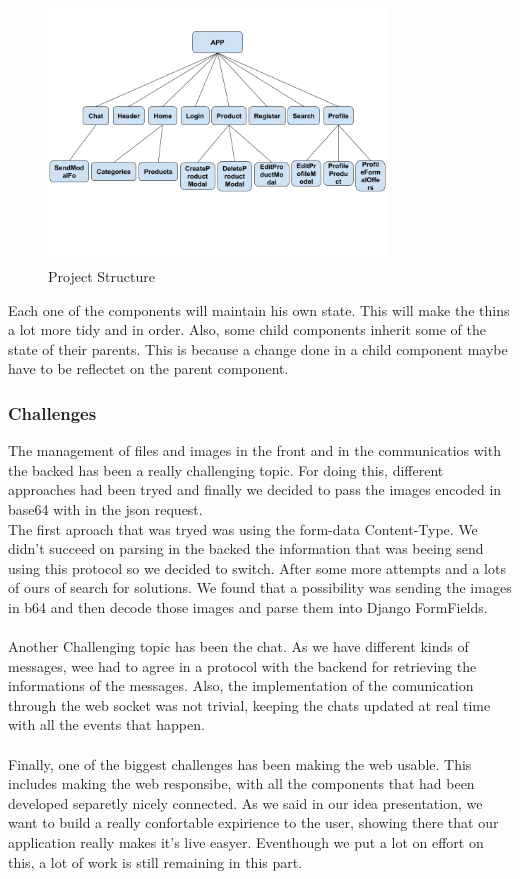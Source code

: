 \documentclass[./main.tex]{subfiles}
\begin{document}
\begin{figure}[H]
	\centering
	\includegraphics[width=0.8\textwidth]{img/React-tree.png}
	\caption{Project Structure}
	\label{fig:redux}
\end{figure}
Each one of the components will maintain his own state. This will make the thins a lot more tidy and in order. Also, some child components inherit some of the state of their parents. This is because a change done in a child component maybe have to be reflectet on the parent component. 
\subsubsection{Challenges}
The management of files and images in the front and in the communicatios with the backed has 
been a really challenging topic. For doing this, different approaches had been tryed and finally
we decided to pass the images encoded in base64 with in the json request.\\
The first aproach that was tryed was using the form-data Content-Type. We didn't succeed on parsing in the backed the 
information that was beeing send using this protocol so we decided to switch. 
After some more attempts and a lots of ours of search for solutions. We found that a possibility was sending
the images in b64 and then decode those images and parse them into Django FormFields.
\\\\
Another Challenging topic has been the chat. As we have different kinds of messages, wee had to agree
in a protocol with the backend for retrieving the informations of the messages. Also, the implementation
of the comunication through the web socket was not trivial, keeping the chats updated at real time with 
all the events that happen.
\\\\
Finally, one of the biggest challenges has been making the web usable. This includes making the web responsibe,
with all the components that had been developed separetly nicely connected. As we said in our idea presentation,
we want to build a really confortable expirience to the user, showing there that our application
really makes it's live easyer. Eventhough we put a lot on effort on this, a lot of work is still remaining in this
part. 
\end{document}
